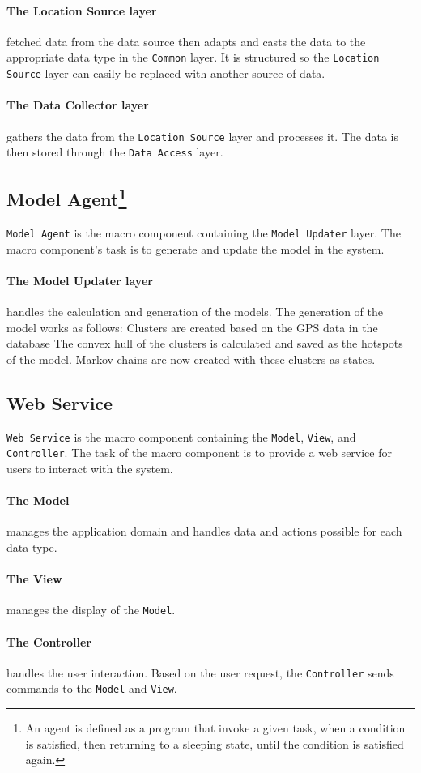 \paragraph{The Location Source layer} fetched data from the data source then adapts and casts the data to the appropriate data type in the \texttt{Common} layer.
It is structured so the \texttt{Location Source} layer can easily be replaced with another source of data.

\paragraph{The Data Collector layer} gathers the data from the \texttt{Location Source} layer and processes it. 
The data is then stored through the \texttt{Data Access} layer.


\subsection*{Model Agent\footnote{An agent is defined as a program that invoke a given task, when a condition is satisfied, then returning to a sleeping state, until the condition is satisfied again.\cite{definitionagent}}}\texttt{Model Agent} is the macro component containing the \texttt{Model Updater} layer.
The macro component's task is to generate and update the model in the system. 

\paragraph{The Model Updater layer} handles the calculation and generation of the models.
The generation of the model works as follows:
Clusters are created based on the GPS data in the database
The convex hull of the clusters is calculated and saved as the hotspots of the model.
Markov chains are now created with these clusters as states.

\subsection*{Web Service}\label{arch:webservice}
\texttt{Web Service} is the macro component containing the \texttt{Model}, \texttt{View}, and \texttt{Controller}.
The task of the macro component is to provide a web service for users to interact with the system.

\paragraph{The Model} manages the application domain and handles data and actions possible for each data type.

\paragraph{The View} manages the display of the \texttt{Model}.

\paragraph{The Controller} handles the user interaction. Based on the user request, the \texttt{Controller} sends commands to the \texttt{Model} and \texttt{View}.